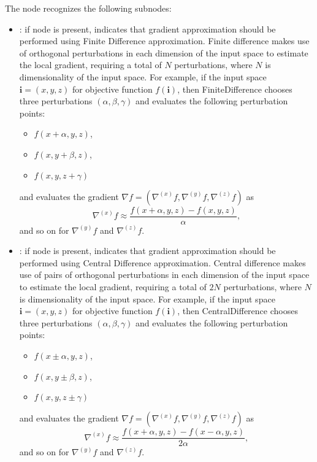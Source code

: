 \begin{itemize}
      The  node recognizes the following subnodes:
      \begin{itemize}
        \item {}:
          if node is present, indicates that gradient approximation should be performed
          using Finite Difference approximation. Finite difference makes use of orthogonal
          perturbations         in each dimension of the input space to estimate the local gradient,
          requiring a total of $N$         perturbations, where $N$ is dimensionality of the input
          space. For example, if the input space         $\mathbf{i} = (x, y, z)$ for objective
          function $f(\mathbf{i})$, then FiniteDifference chooses         three perturbations
          $(\alpha, \beta, \gamma)$ and evaluates the following perturbation points:
          \begin{itemize}           \item $f(x+\alpha, y, z)$,           \item $f(x, y+\beta, z)$,
          \item $f(x, y, z+\gamma)$         \end{itemize}         and evaluates the gradient $\nabla
          f = (\nabla^{(x)} f, \nabla^{(y)} f, \nabla^{(z)} f)$ as         \begin{equation*}
          \nabla^{(x)}f \approx \frac{f(x+\alpha, y, z) - f(x, y, z)}{\alpha},
          \end{equation*}         and so on for $ \nabla^{(y)}f$ and $\nabla^{(z)}f$.

        \item {}:
          if node is present, indicates that gradient approximation should be performed
          using Central Difference approximation. Central difference makes use of pairs of
          orthogonal perturbations         in each dimension of the input space to estimate the
          local gradient, requiring a total of $2N$         perturbations, where $N$ is
          dimensionality of the input space. For example, if the input space         $\mathbf{i} =
          (x, y, z)$ for objective function $f(\mathbf{i})$, then CentralDifference chooses
          three perturbations $(\alpha, \beta, \gamma)$ and evaluates the following perturbation
          points:         \begin{itemize}           \item $f(x\pm\alpha, y, z)$,           \item
          $f(x, y\pm\beta, z)$,           \item $f(x, y, z\pm\gamma)$         \end{itemize}
          and evaluates the gradient $\nabla f = (\nabla^{(x)} f, \nabla^{(y)} f, \nabla^{(z)} f)$
          as         \begin{equation*}           \nabla^{(x)}f \approx \frac{f(x+\alpha, y, z) -
          f(x-\alpha, y, z)}{2\alpha},         \end{equation*}         and so on for $
          \nabla^{(y)}f$ and $\nabla^{(z)}f$.


\end{itemize}
\end{itemize}
